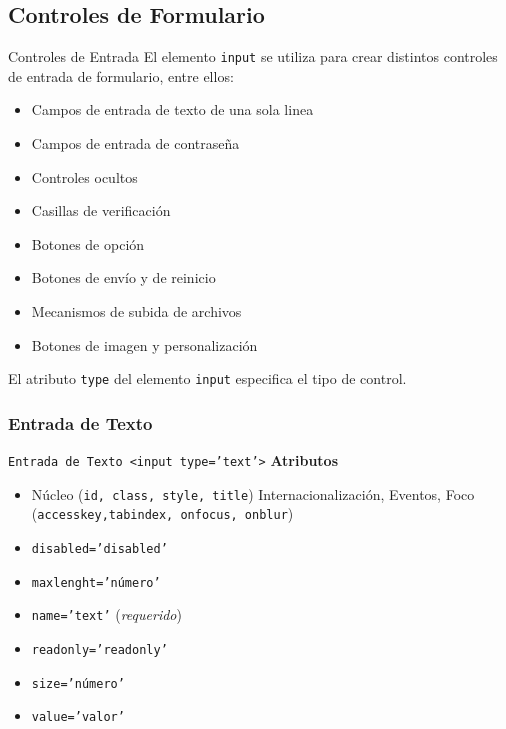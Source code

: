 \documentclass{beamer}
\begin{document}

\subsection{Controles de Formulario} %

\begin{frame}{Controles de Entrada} %
    El elemento \texttt{input} se utiliza para crear distintos controles de
    entrada de formulario,  entre ellos: 

    \begin{itemize}
        \item Campos de entrada de texto de una sola linea
        \item Campos de entrada de contraseña
        \item Controles ocultos 
        \item Casillas de verificación 
        \item Botones de opción
        \item Botones de envío y de reinicio
        \item Mecanismos de subida de archivos
        \item Botones de imagen y personalización
    \end{itemize}

    El atributo \texttt{type} del elemento \texttt{input} especifica el tipo de
    control. 
\end{frame}

\subsubsection{Entrada de Texto}

\begin{frame}{\texttt{Entrada de Texto <input type='text'>}} %
    \textbf{Atributos}
    \begin{itemize}
        \item Núcleo (\texttt{id, class, style, title}) Internacionalización,
        Eventos, Foco (\texttt{accesskey,tabindex, onfocus, onblur})
        \item  \texttt{disabled='disabled'}
        \item \texttt{maxlenght='número'}
        \item \texttt{name='text'} (\textit{requerido})
        \item \texttt{readonly='readonly'}
        \item \texttt{size='número'}
        \item \texttt{value='valor'}
    \end{itemize}
\end{frame}
\end{document}
